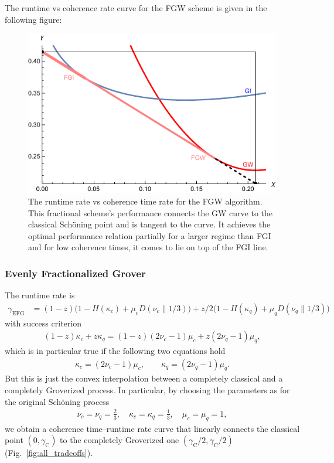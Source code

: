 \documentclass[a4paper,aps,floatfix]{revtex4}
\begin{document}
The runtime vs coherence rate curve for the FGW scheme is given in the following figure:
\begin{figure}[H]
\begin{center}
	\includegraphics[scale=.75]{images/fgw-tradeoffs}
\end{center}
\caption{The runtime rate vs coherence time rate for the FGW algorithm. This fractional scheme's performance connects the GW curve to the classical Sch\"oning point and is tangent to the curve. It achieves the optimal performance relation partially for a larger regime than FGI and for low coherence times, it comes to lie on top of the FGI line.}
\end{figure}


\subsubsection{Evenly Fractionalized Grover}

The runtime rate is
\begin{align}
	\gamma_{\textrm{EFG}}
    &= 
		(1-z)\Big(
			1- H(\kappa_c)
			+
			\mu_c D(\nu_c \parallel 1/3)
		\Big) 
		+
		z/2\Big(
			1- H(\kappa_q)
			+
			\mu_q D(\nu_q \parallel 1/3)
		\Big)
\end{align}
with success criterion
\begin{align*}
	(1-z)\kappa_c + z\kappa_q 
	=
	(1-z)(2\nu_c-1)\mu_c + 
	z(2\nu_q-1)\mu_q,
\end{align*}
which is in particular true if the following two equations hold
\begin{align*}
	\kappa_c 
	=
	(2\nu_c-1)\mu_c,
	\qquad
	\kappa_q
	=
	(2\nu_q-1)\mu_q.
\end{align*}
But this is just the convex interpolation between a completely classical and a completely Groverized process.
In particular, by choosing the parameters as for the original Sch\"oning process
\begin{align*}
	\nu_c=\nu_q=\frac23,
	\quad
	\kappa_c=\kappa_q=\frac13,
	\quad 
	\mu_c=\mu_q=1,
\end{align*}
we obtain a coherence time--runtime rate curve that linearly connects the classical point $(0,\gamma_{\mathrm{C}})$ to the completely Groverized one $(\gamma_{\mathrm{C}}/2, \gamma_{\mathrm{C}}/2)$ (Fig.~\ref{fig:all_tradeoffs}).
\end{document}

